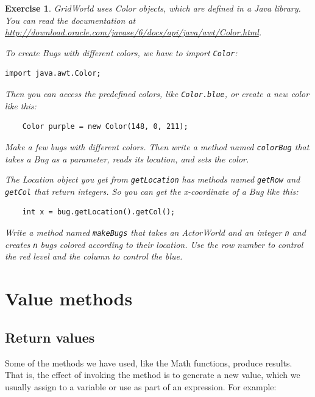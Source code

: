 \documentclass[12pt]{book}
\theoremstyle{exercise}
\newtheorem{exercise}{Exercise}[chapter]
\begin{document}
\begin{exercise}

GridWorld uses Color objects, which are defined in a Java library.
You can read the documentation at
\url{http://download.oracle.com/javase/6/docs/api/java/awt/Color.html}.

To create Bugs with different colors, we have to import
{\tt Color}:

\begin{lstlisting}
import java.awt.Color;
\end{lstlisting}

Then you can access the predefined colors, like {\tt Color.blue}, or
create a new color like this:

\begin{lstlisting}
    Color purple = new Color(148, 0, 211);
\end{lstlisting}

Make a few bugs with different colors.  Then write a method named
{\tt colorBug} that takes a Bug as a parameter, reads its location,
and sets the color.

The Location object you get from
{\tt getLocation} has methods named {\tt getRow} and {\tt getCol} that
return integers.  So you can get the x-coordinate of a Bug like this:

\begin{lstlisting}
    int x = bug.getLocation().getCol();
\end{lstlisting}

Write a method named {\tt makeBugs} that takes an ActorWorld and an
integer {\tt n} and creates {\tt n} bugs colored according to their
location.  Use the row number to control the red level and the column
to control the blue.

\end{exercise}



\chapter{Value methods}
\label{chap05}

\section{Return values}

Some of the methods we have used, like the Math
functions, produce results.  That is, the effect of
invoking the method is to generate a new value, which we
usually assign to a variable or use as part of an expression.
For example:
\end{document}
